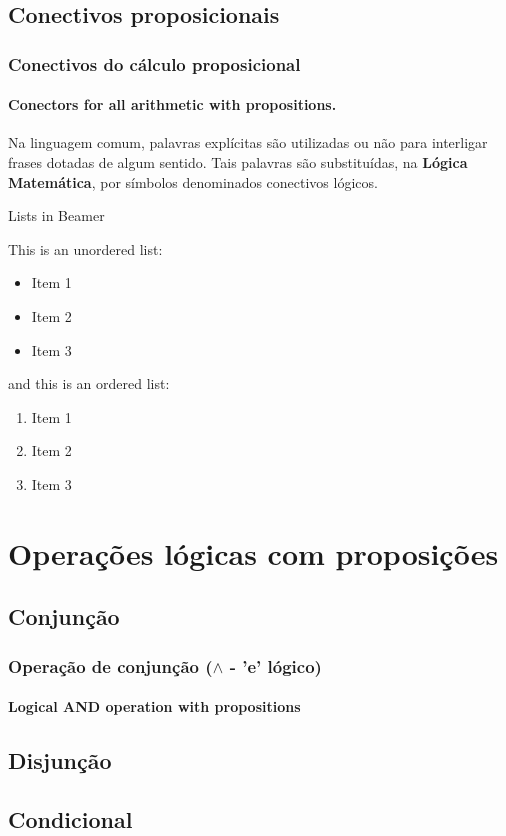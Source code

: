 \documentclass[10pt]{beamer}
\begin{document}
\subsection{Conectivos proposicionais}
%
\begin{frame}[t]
    \frametitle{Conectivos do cálculo proposicional}
    \framesubtitle{Conectors for all arithmetic with propositions.}
    Na linguagem comum, palavras explícitas são utilizadas ou não para interligar frases dotadas de algum sentido. Tais palavras são substituídas, na \textbf{Lógica Matemática}, por símbolos denominados conectivos lógicos.
\end{frame}
\begin{frame}{Lists in Beamer}

This is an unordered list:
\begin{itemize}
    \item Item 1
    \item Item 2
    \item Item 3
\end{itemize}

and this is an ordered list:
\begin{enumerate}
    \item Item 1
    \item Item 2
    \item Item 3
\end{enumerate}

\end{frame}
%
\section{Operações lógicas com proposições}
%
\subsection{Conjunção}
%
\begin{frame}
    \frametitle{Operação de conjunção ($\land$ - 'e' lógico)}
    \framesubtitle{Logical AND operation with propositions}
\end{frame}
%
\subsection{Disjunção}
%
\subsection{Condicional}
%
\end{document}
